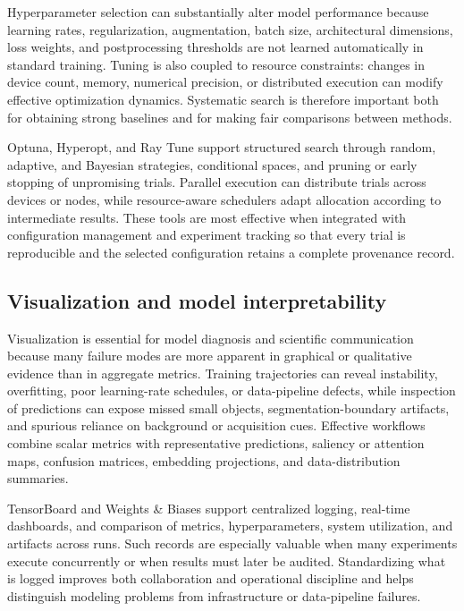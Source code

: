 \documentclass{article}
\begin{document}
Hyperparameter selection can substantially alter model performance because learning rates, regularization, augmentation, batch size, architectural dimensions, loss weights, and postprocessing thresholds are not learned automatically in standard training. Tuning is also coupled to resource constraints: changes in device count, memory, numerical precision, or distributed execution can modify effective optimization dynamics. Systematic search is therefore important both for obtaining strong baselines and for making fair comparisons between methods.

Optuna, Hyperopt, and Ray Tune support structured search through random, adaptive, and Bayesian strategies, conditional spaces, and pruning or early stopping of unpromising trials. Parallel execution can distribute trials across devices or nodes, while resource-aware schedulers adapt allocation according to intermediate results. These tools are most effective when integrated with configuration management and experiment tracking so that every trial is reproducible and the selected configuration retains a complete provenance record.


\subsection{Visualization and model interpretability}

Visualization is essential for model diagnosis and scientific communication because many failure modes are more apparent in graphical or qualitative evidence than in aggregate metrics. Training trajectories can reveal instability, overfitting, poor learning-rate schedules, or data-pipeline defects, while inspection of predictions can expose missed small objects, segmentation-boundary artifacts, and spurious reliance on background or acquisition cues. Effective workflows combine scalar metrics with representative predictions, saliency or attention maps, confusion matrices, embedding projections, and data-distribution summaries.

TensorBoard and Weights \& Biases support centralized logging, real-time dashboards, and comparison of metrics, hyperparameters, system utilization, and artifacts across runs. Such records are especially valuable when many experiments execute concurrently or when results must later be audited. Standardizing what is logged improves both collaboration and operational discipline and helps distinguish modeling problems from infrastructure or data-pipeline failures.
\end{document}
